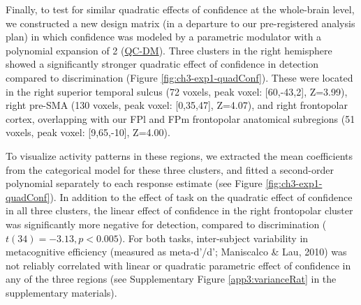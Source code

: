 \documentclass[12pt,twoside]{reedthesis}
\begin{document}
Finally, to test for similar quadratic effects of confidence at the whole-brain level, we constructed a new design matrix (in a departure to our pre-registered analysis plan) in which confidence was modeled by a parametric modulator with a polynomial expansion of 2 (\url{QC-DM}). Three clusters in the right hemisphere showed a significantly stronger quadratic effect of confidence in detection compared to discrimination (Figure \ref{fig:ch3-exp1-quadConf}). These were located in the right superior temporal sulcus (72 voxels, peak voxel: {[}60,-43,2{]}, Z=3.99), right pre-SMA (130 voxels, peak voxel: {[}0,35,47{]}, Z=4.07), and right frontopolar cortex, overlapping with our FPl and FPm frontopolar anatomical subregions (51 voxels, peak voxel: {[}9,65,-10{]}, Z=4.00).

To visualize activity patterns in these regions, we extracted the mean coefficients from the categorical model for these three clusters, and fitted a second-order polynomial separately to each response estimate (see Figure \ref{fig:ch3-exp1-quadConf}). In addition to the effect of task on the quadratic effect of confidence in all three clusters, the linear effect of confidence in the right frontopolar cluster was significantly more negative for detection, compared to discrimination (\(t(34)=-3.13, p<0.005\)). For both tasks, inter-subject variability in metacognitive efficiency (measured as meta-d'/d'; Maniscalco \& Lau, 2010) was not reliably correlated with linear or quadratic parametric effect of confidence in any of the three regions (see Supplementary Figure \ref{app3:varianceRat} in the supplementary materials).
\end{document}
